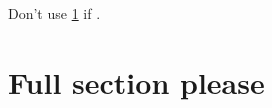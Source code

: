 \documentclass{article}
\begin{document}
Don't use \cref{sec:some.label} if .

\section{Full section please}\label{sec:some.label}
\end{document}
